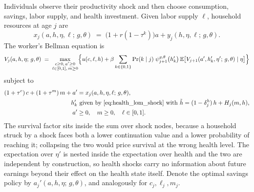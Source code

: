 \documentclass[12pt,a4paper]{article}
\newcommand{\E}{\mathbb{E}}
\begin{document}
Individuals observe their productivity shock and then choose consumption, savings, labor supply, and health investment. Given labor supply $\ell$, household resources at age $j$ are
\begin{equation}
\label{eq:resources_worker}
x_j(a, h, \eta, \ell;\, g, \theta) \;=\; \bigl(1 + r(1 - \tau^k)\bigr) a + y_j(h, \eta, \ell;\, g, \theta).
\end{equation}
The worker's Bellman equation is
\begin{equation}
\label{eq:worker_bellman}
V_j(a, h, \eta;\, g,\theta)
\;=\;
\max_{\substack{c \geq 0,\, a' \geq 0 \\ \ell \in [0,1],\, m \geq 0}}
\Bigl\{
u(c, \ell, h)
+ \beta \sum_{k \in \{0,1\}} \Pr(k \mid j)\;
\psi_{j+1}^{g,\theta}\bigl(h'_k\bigr)\,
\E\bigl[V_{j+1}(a', h'_k, \eta';\, g, \theta) \mid \eta\bigr]
\Bigr\}
\end{equation}
subject to
\begin{align}
(1 + \tau^c)\, c + (1 + \tau^m)\, m + a' &= x_j(a, h, \eta, \ell;\, g, \theta), \label{eq:worker_budget}\\
h'_k &\ \text{given by~\eqref{eq:health_lom_shock} with } \tilde h = (1 - \delta_j^h)\, h + H_j(m, h), \label{eq:worker_health}\\
a' &\geq 0,\quad m \geq 0,\quad \ell \in [0,1]. \label{eq:worker_borrow}
\end{align}
The survival factor sits inside the sum over shock nodes, because a household struck by a shock faces both a lower continuation value and a lower probability of reaching it; collapsing the two would price survival at the wrong health level. The expectation over $\eta'$ is nested inside the expectation over health and the two are independent by construction, so health shocks carry no information about future earnings beyond their effect on the health state itself. Denote the optimal savings policy by $a_j'(a, h, \eta;\, g, \theta)$, and analogously for $c_j, \ell_j, m_j$.
\end{document}
